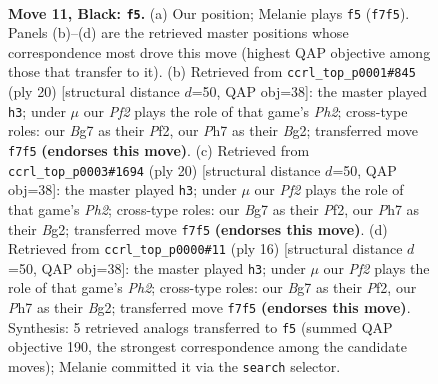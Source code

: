 \documentclass[11pt]{article}
\begin{document}
\clearpage

\begin{figure}[p]\centering
\begin{subfigure}{0.46\textwidth}\centering
\resizebox{\linewidth}{!}{%
\newchessgame
\chessboard[
  setfen={r1bq1rk1/pp1p1pbp/2n3p1/2p1p2n/2P4P/4PNP1/PP1P1PB1/RNBQRK2 b - - 3 11},
  showmover=false,
  pgfstyle=straightmove, color=movearrow, markmove={f7-f5}
]}
\caption{}
\end{subfigure}\hfill
\begin{subfigure}{0.46\textwidth}\centering
\resizebox{\linewidth}{!}{%
\newchessgame
\chessboard[
  setfen={rnbq1rk1/1p2ppbp/p2p1np1/8/3NP3/2N3P1/PPP2PBP/R1BQ1RK1 w - - 4 11},
  showmover=false,
  pgfstyle=straightmove, color=movearrow, markmove={h2-h3}
]}
\caption{}
\end{subfigure}
\\[4pt]
\begin{subfigure}{0.46\textwidth}\centering
\resizebox{\linewidth}{!}{%
\newchessgame
\chessboard[
  setfen={rnbq1rk1/1p2ppbp/p2p1np1/8/3NP3/2N3P1/PPP2PBP/R1BQ1RK1 w - - 4 11},
  showmover=false,
  pgfstyle=straightmove, color=movearrow, markmove={h2-h3}
]}
\caption{}
\end{subfigure}\hfill
\begin{subfigure}{0.46\textwidth}\centering
\resizebox{\linewidth}{!}{%
\newchessgame
\chessboard[
  setfen={rnbq1rk1/1p2ppbp/p2p1np1/8/3NP3/2N3P1/PPP2PBP/R1BQ1RK1 w - - 5 9},
  showmover=false,
  pgfstyle=straightmove, color=movearrow, markmove={h2-h3}
]}
\caption{}
\end{subfigure}
\caption{\textbf{Move 11, Black: \texttt{f5}.} (a) Our position; Melanie plays \texttt{f5} (\texttt{f7f5}). Panels (b)--(d) are the retrieved master positions whose correspondence most drove this move (highest QAP objective among those that transfer to it). (b) Retrieved from \texttt{ccrl\_top\_p0001\#845} (ply 20) [structural distance $d$=50, QAP obj=38]: the master played \texttt{h3}; under $\mu$ our \emph{Pf2} plays the role of that game's \emph{Ph2}; cross-type roles: our \emph{B}g7 as their \emph{P}f2, our \emph{P}h7 as their \emph{B}g2; transferred move \texttt{f7f5} \textbf{(endorses this move)}. (c) Retrieved from \texttt{ccrl\_top\_p0003\#1694} (ply 20) [structural distance $d$=50, QAP obj=38]: the master played \texttt{h3}; under $\mu$ our \emph{Pf2} plays the role of that game's \emph{Ph2}; cross-type roles: our \emph{B}g7 as their \emph{P}f2, our \emph{P}h7 as their \emph{B}g2; transferred move \texttt{f7f5} \textbf{(endorses this move)}. (d) Retrieved from \texttt{ccrl\_top\_p0000\#11} (ply 16) [structural distance $d$=50, QAP obj=38]: the master played \texttt{h3}; under $\mu$ our \emph{Pf2} plays the role of that game's \emph{Ph2}; cross-type roles: our \emph{B}g7 as their \emph{P}f2, our \emph{P}h7 as their \emph{B}g2; transferred move \texttt{f7f5} \textbf{(endorses this move)}. Synthesis: 5 retrieved analogs transferred to \texttt{f5} (summed QAP objective 190, the strongest correspondence among the candidate moves); Melanie committed it via the \texttt{search} selector.}
\label{fig:thought-m21}
\end{figure}
\end{document}
